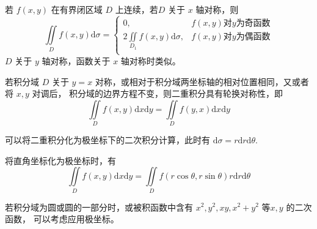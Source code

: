 \begin{Theo}[对称性]

    若 $ f(x,y) $ 在有界闭区域 $ D $ 上连续，若$ D $ 关于 $ x $ 轴对称，则$$
        \iint\limits_{D}f(x,y)\mathrm{d}\sigma = \begin{cases}
            0,& f(x,y)\textrm{对}y\textrm{为奇函数}\\
            2\iint\limits_{D_1}f(x,y)\mathrm{d}\sigma,& f(x,y)\textrm{对}y\textrm{为偶函数}\\
        \end{cases}
    $$ 
    $ D $ 关于 $ y $ 轴对称，函数关于 $ x $ 轴对称时类似。
\end{Theo}

\begin{Theo}[轮换对称性]

    若积分域 $ D $ 关于 $ y = x $ 对称，或相对于积分域两坐标轴的相对位置相同，又或者将 $ x,y $ 对调后，
    积分域的边界方程不变，则二重积分具有轮换对称性，即$$
        \iint\limits_{D}f(x,y)\mathrm{d}x\mathrm{d}y = \iint\limits_{D}f(y,x)\mathrm{d}x\mathrm{d}y
    $$ 
\end{Theo}

可以将二重积分化为极坐标下的二次积分计算，此时有 $ \mathrm{d}\sigma = r\mathrm{d}r\mathrm{d}\theta $.

将直角坐标化为极坐标时，有$$
    \iint\limits_{D}f(x,y)\mathrm{d}x\mathrm{d}y = 
    \iint\limits_{D}f(r\cos\theta,r\sin\theta)r\mathrm{d}r\mathrm{d}\theta
$$ 

若积分域为圆或圆的一部分时，或被积函数中含有 $ x^2,y^2,xy,x^2+y^2 $ 等$ x,y $ 的二次函数，
可以考虑应用极坐标。

